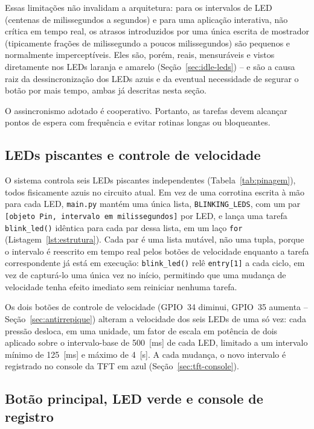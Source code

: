\documentclass[12pt,a4paper]{article}
\begin{document}
Essas limitações não invalidam a arquitetura: para os intervalos de LED (centenas de milissegundos a segundos) e para uma aplicação interativa, não crítica em tempo real, os atrasos introduzidos por uma única escrita de mostrador (tipicamente frações de milissegundo a poucos milissegundos) são pequenos e normalmente imperceptíveis. Eles são, porém, reais, mensuráveis e vistos diretamente nos LEDs laranja e amarelo (Seção~\ref{sec:idle-leds}) -- e são a causa raiz da dessincronização dos LEDs azuis e da eventual necessidade de segurar o botão por mais tempo, ambas já descritas nesta seção.

O assincronismo adotado é cooperativo. Portanto, as tarefas devem alcançar pontos de espera com frequência e evitar rotinas longas ou bloqueantes.

\subsection{LEDs piscantes e controle de velocidade}

O sistema controla seis LEDs piscantes independentes (Tabela~\ref{tab:pinagem}), todos fisicamente azuis no circuito atual. Em vez de uma corrotina escrita à mão para cada LED, \texttt{main.py} mantém uma única lista, \texttt{BLINKING\_LEDS}, com um par \texttt{[objeto Pin, intervalo em milissegundos]} por LED, e lança uma tarefa \texttt{blink\_led()} idêntica para cada par dessa lista, em um laço \texttt{for} (Listagem~\ref{lst:estrutura}). Cada par é uma lista mutável, não uma tupla, porque o intervalo é reescrito em tempo real pelos botões de velocidade enquanto a tarefa correspondente já está em execução: \texttt{blink\_led()} relê \texttt{entry[1]} a cada ciclo, em vez de capturá-lo uma única vez no início, permitindo que uma mudança de velocidade tenha efeito imediato sem reiniciar nenhuma tarefa.

Os dois botões de controle de velocidade (GPIO~34 diminui, GPIO~35 aumenta -- Seção~\ref{sec:antirrepique}) alteram a velocidade dos seis LEDs de uma só vez: cada pressão desloca, em uma unidade, um fator de escala em potência de dois aplicado sobre o intervalo-base de 500~[ms] de cada LED, limitado a um intervalo mínimo de 125~[ms] e máximo de 4~[s]. A cada mudança, o novo intervalo é registrado no console da TFT em azul (Seção~\ref{sec:tft-console}).

\subsection{Botão principal, LED verde e console de registro}
\end{document}
